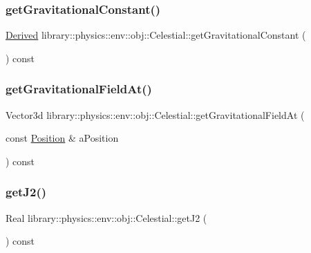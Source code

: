 \subsubsection{\texorpdfstring{get\+Gravitational\+Constant()}{getGravitationalConstant()}}
{\footnotesize\ttfamily \hyperlink{classlibrary_1_1physics_1_1units_1_1_derived}{Derived} library\+::physics\+::env\+::obj\+::\+Celestial\+::get\+Gravitational\+Constant (\begin{DoxyParamCaption}{ }\end{DoxyParamCaption}) const}

\mbox{\label{classlibrary_1_1physics_1_1env_1_1obj_1_1_celestial_ac715a5cc62581070d55ab839e3309c9e}} 
\subsubsection{\texorpdfstring{get\+Gravitational\+Field\+At()}{getGravitationalFieldAt()}}
{\footnotesize\ttfamily Vector3d library\+::physics\+::env\+::obj\+::\+Celestial\+::get\+Gravitational\+Field\+At (\begin{DoxyParamCaption}\item[{const \hyperlink{classlibrary_1_1physics_1_1coord_1_1_position}{Position} \&}]{a\+Position }\end{DoxyParamCaption}) const}

\mbox{\label{classlibrary_1_1physics_1_1env_1_1obj_1_1_celestial_a3740b398dca520bd50862f67c29ab8e7}} 
\subsubsection{\texorpdfstring{get\+J2()}{getJ2()}}
{\footnotesize\ttfamily Real library\+::physics\+::env\+::obj\+::\+Celestial\+::get\+J2 (\begin{DoxyParamCaption}{ }\end{DoxyParamCaption}) const}

